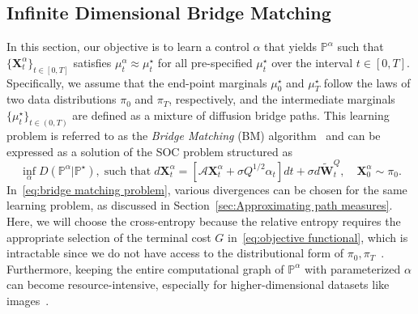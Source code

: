 \documentclass[nohyperref]{article}
\theoremstyle{plain}
\theoremstyle{remark}
\newcommand{\mc}{\mathcal}
\newcommand{\mb}{\mathbf}
\begin{document}
\subsection{Infinite Dimensional Bridge Matching}\label{subsection:bridge matching}
In this section, our objective is to learn a control $\alpha$ that yields $\mathbb{P}^{\alpha}$ such that $\{\mb{X}^{\alpha}_t\}_{t \in [0, T]}$ satisfies $\mu^{\alpha}_t \approx \mu^{\star}_t$ for all pre-specified $\mu^{\star}_t$ over the interval $t \in [0, T]$. Specifically, we assume that the end-point marginals $\mu^{\star}_0$ and $\mu^{\star}_T$ follow the laws of two data distributions $\pi_0$ and $\pi_T$, respectively, and the intermediate marginals $\{\mu^{\star}_t\}_{t \in (0, T)}$ are defined as a mixture of diffusion bridge paths. This learning problem is referred to as the \textit{Bridge Matching} (BM) algorithm~\citep{peluchetti2022nondenoising, shi2024diffusion, liu2023i2sb} and can be expressed as a solution of the SOC problem structured as
\begin{equation}\label{eq:bridge matching problem}
\inf_{\alpha}D(\mathbb{P}^{\alpha}|\mathbb{P}^{\star}), \; \text{such that} \;  d\mb{X}^{\alpha}_t = \left[ \mc{A}\mb{X}^{\alpha}_t  + \sigma Q^{1/2}\alpha_t \right] dt + \sigma d\mb{\tilde{W}}^Q_t, \quad \mb{X}^{\alpha}_0 \sim \pi_0.
\end{equation}
In~\eqref{eq:bridge matching problem}, various divergences can be chosen for the same learning problem, as discussed in Section~\ref{sec:Approximating path measures}. Here, we will choose the cross-entropy because the relative entropy requires the appropriate selection of the terminal cost $G$ in~\eqref{eq:objective functional}, which is intractable since we do not have access to the distributional form of $\pi_0, \pi_T$~\citep{liu2024generalized}.
Furthermore, keeping the entire computational graph of $\mathbb{P}^{\alpha}$ with parameterized $\alpha$ can become resource-intensive, especially for higher-dimensional datasets like images~\citep{chen2022likelihood}.
\end{document}
